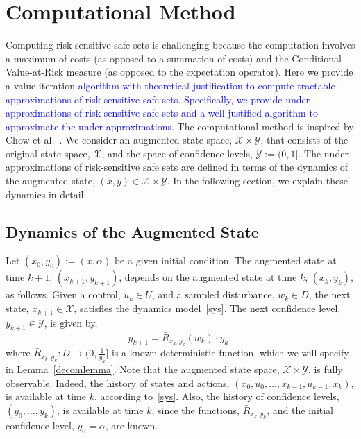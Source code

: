 \documentclass[letterpaper, 10 pt, conference]{ieeeconf}  %
\begin{document}

\section{Computational Method}
\label{sec::alg}
Computing risk-sensitive safe sets is challenging because the computation involves a maximum of costs (as opposed to a summation of costs)
and the Conditional Value-at-Risk measure (as opposed to the expectation operator). Here we provide 
a value-iteration \textcolor{blue}{algorithm with theoretical justification to compute tractable approximations of risk-sensitive safe sets}.
\textcolor{blue}{Specifically, we provide under-approximations of risk-sensitive safe sets and a well-justified algorithm to approximate the under-approximations.}  
The computational method is inspired by Chow et al.~\cite{chow2015risk}.
We consider an augmented state space, $\mathcal{X} \times \mathcal{Y}$, that consists of the original state space, $\mathcal{X}$, 
and the space of confidence levels, $\mathcal{Y} := (0,1]$.
The under-approximations of risk-sensitive safe sets are defined in terms of the dynamics of the augmented state, $(x,y) \in \mathcal{X} \times \mathcal{Y}$. 
In the following section, we explain these dynamics in detail.

\subsection{Dynamics of the Augmented State}
Let $(x_0, y_0) := (x, \alpha)$ be a given initial condition.
The augmented state at time $k+1$, $(x_{k+1}, y_{k+1})$, depends on the augmented state at time $k$, $(x_k, y_k)$, as follows.
Given a control, $u_k \in U$, and a sampled disturbance, $w_k \in D$, the next state, $x_{k+1} \in \mathcal{X}$, satisfies the dynamics model~\eqref{sys}. 
The next confidence level, $y_{k+1} \in \mathcal{Y}$, is given by,
\begin{equation}
y_{k+1} = \bar{R}_{x_k,y_k}(w_k) \cdot y_k,\label{Rbar}
\end{equation}
where $\bar{R}_{x_k, y_k} : D \to (0, \frac{1}{y_k}]$ is a known deterministic function, 
which we will specify in Lemma~\ref{decomlemma}. 
Note that the augmented state space, $\mathcal{X} \times \mathcal{Y}$, is fully observable.
Indeed, the history of states and actions, $(x_0, u_0, \hdots, x_{k-1}, u_{k-1}, x_{k})$, is available at time $k$, according to~\eqref{sys}. 
Also, the history of confidence levels, $(y_0, \hdots, y_k)$, is available at time $k$, since
the functions, $\bar{R}_{x_k,y_k}$, and the initial confidence level, $y_0 = \alpha$, are known.
\end{document}
